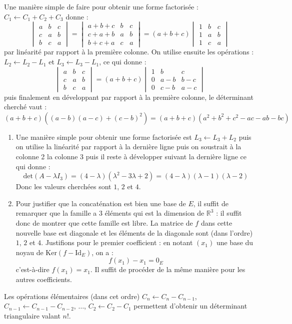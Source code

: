 \documentclass[a4paper,twoside,french,11pt]{VcCours}
\begin{document}
\begin{Exercice}{}\end{Exercice}Une manière simple de faire pour obtenir une forme factorisée : $C_1 \leftarrow C_1+C_2+C_3$ donne :
$$\begin{vmatrix}
      a & b & c \\
      c & a & b \\
      b & c & a
    \end{vmatrix} = \begin{vmatrix}
      a +b+c& b & c \\
      c+a+b & a & b \\
      b+c+a & c & a
    \end{vmatrix} = (a+b+c) \begin{vmatrix}
      1 & b & c \\
      1 & a & b \\
      1 & c & a
    \end{vmatrix}$$
par linéarité par rapport à la première colonne. On utilise ensuite les opérations : $L_2 \leftarrow L_2-L_1$ et $L_3 \leftarrow L_3 - L_1$, ce qui donne :
$$\begin{vmatrix}
      a & b & c \\
      c & a & b \\
      b & c & a
    \end{vmatrix} = (a+b+c) \begin{vmatrix}
      1 & b & c \\
      0 & a -b& b-c \\
      0 & c-b & a-c
    \end{vmatrix}$$
puis finalement en développant par rapport à la première colonne, le déterminant cherché vaut :
$$ (a+b+c)((a-b)(a-c)+(c-b)^2) = (a+b+c)(a^2+b^2+c^2-ac-ab-bc)$$



\begin{Exercice}{}\end{Exercice}

\begin{enumerate}
\item Une manière simple pour obtenir une forme factorisée est $L_3 \leftarrow L_3+L_2$ puis on utilise la linéarité par rapport à la dernière ligne puis on soustrait à la colonne 2 la colonne 3 puis il reste à développer suivant la dernière ligne ce qui donne :
$$ \textrm{det}(A- \lambda I_3) = (4-\lambda)(\lambda ^2-3\lambda +2) = (4 - \lambda)(\lambda-1)(\lambda-2) $$
Donc les valeurs cherchées sont $1$, $2$ et $4$.
\item Pour justifier que la concaténation est bien une base de $E$, il suffit de remarquer que la famille a $3$ éléments qui est la dimension de $\mathbb{R}^3$ : il suffit donc de montrer que cette famille est libre. La matrice de $f$ dans cette nouvelle base est diagonale et les éléments de la diagonale sont (dans l'ordre) $1$, $2$ et $4$. Justifions pour le premier coefficient : en notant $(x_1)$ une base du noyau de $\textrm{Ker}(f-\textrm{Id}_E)$, on a :
$$ f(x_1)- x_1 = 0_E$$
c'est-à-dire $f(x_1)=x_1$. Il suffit de procéder de la même manière pour les autres coefficients.
\end{enumerate}



\begin{Exercice}{}\end{Exercice}Les opérations élémentaires (dans cet ordre) $C_n \leftarrow C_n - C_{n-1}$, $C_{n-1} \leftarrow C_{n-1} - C_{n-2}$, $\ldots$, $C_2 \leftarrow C_2- C_1$ permettent d'obtenir un déterminant triangulaire valant $n!$.
\end{document}
